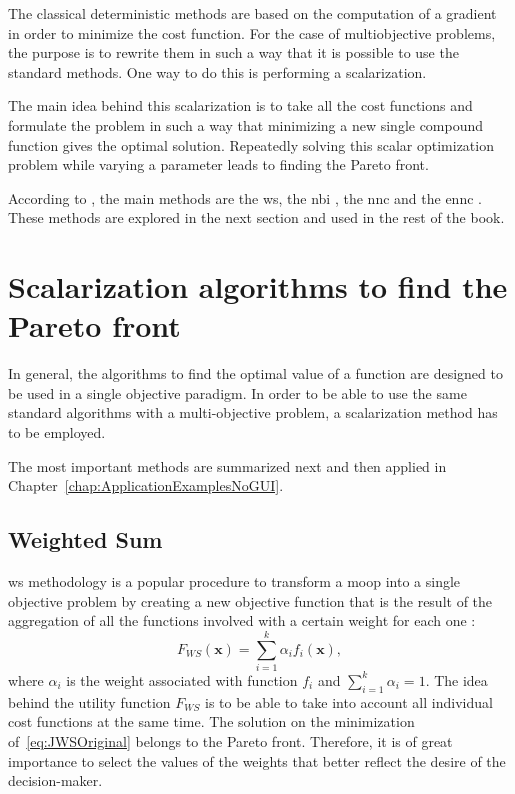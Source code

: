 The classical deterministic methods are based on the computation of a gradient in order to minimize the cost function. For the case of multiobjective problems, the purpose is to rewrite them in such a way that it is possible to use the standard methods. One way to do this is performing a scalarization.

The main idea behind this scalarization is to take all the cost functions and formulate the problem in such a way that minimizing a new single compound function gives the optimal solution. Repeatedly solving this scalar optimization problem while varying a parameter leads to finding the Pareto front.

According to \citet{Marler2004}, the main methods are the \gls{ws}, the \gls{nbi} \citep{Das1998}, the \gls{nnc} \citep{Messac2003} and the \gls{ennc} \citep{Sanchis2008}. These methods are explored in the next section and used in the rest of the book.
\section{Scalarization algorithms to find the Pareto front}
\label{sec:design-methodologies}

In general, the algorithms to find the optimal value of a function are designed to be used in a single objective paradigm. In order to be able to use the same standard algorithms with a multi-objective problem, a scalarization method has to be employed.

The most important methods are summarized next and then applied in Chapter~\ref{chap:ApplicationExamplesNoGUI}.

\subsection{Weighted Sum}
\label{sec:WS}
\gls{ws} methodology is a popular procedure to transform a \gls{moop} into a single objective problem by creating a new objective function that is the result of the aggregation of all the functions involved with a certain weight for each one \citep{Marler2004}:
%
\begin{equation}
F_{WS}(\mathbf{x}) = \sum_{i=1}^{k}\alpha_{i} {f}_{i}(\mathbf{x}),
\label{eq:JWSOriginal}
\end{equation}
%
where $\alpha_i$ is the weight associated with function $f_i$ and $\sum_{i=1}^{k}\alpha_{i} = 1$. The idea behind the utility function $F_{WS}$ is to be able to take into account all individual cost functions at the same time. The solution on the minimization of~\eqref{eq:JWSOriginal} belongs to the Pareto front. Therefore, it is of great importance to select the values of the weights that better reflect the desire of the decision-maker.

